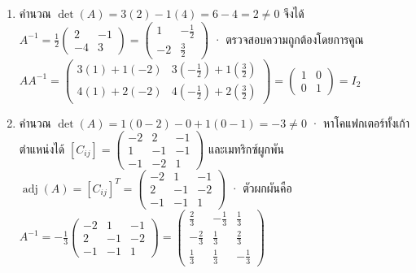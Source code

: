 \begin{enumerate}
    \item คำนวณ $\det(A) = 3(2) - 1(4) = 6 - 4 = 2 \neq 0$ จึงได้ $A^{-1} = \frac{1}{2} \begin{pmatrix} 2 & -1 \\ -4 & 3 \end{pmatrix} = \begin{pmatrix} 1 & -\frac{1}{2} \\ -2 & \frac{3}{2} \end{pmatrix}$ · ตรวจสอบความถูกต้องโดยการคูณ $A A^{-1} = \begin{pmatrix} 3(1)+1(-2) & 3(-\frac{1}{2})+1(\frac{3}{2}) \\ 4(1)+2(-2) & 4(-\frac{1}{2})+2(\frac{3}{2}) \end{pmatrix} = \begin{pmatrix} 1 & 0 \\ 0 & 1 \end{pmatrix} = I_2$

    \item คำนวณ $\det(A) = 1(0-2) - 0 + 1(0-1) = -3 \neq 0$ · หาโคแฟกเตอร์ทั้งเก้าตำแหน่งได้ $[C_{ij}] = \begin{pmatrix} -2 & 2 & -1 \\ 1 & -1 & -1 \\ -1 & -2 & 1 \end{pmatrix}$ และเมทริกซ์ผูกพัน $\operatorname{adj}(A) = [C_{ij}]^T = \begin{pmatrix} -2 & 1 & -1 \\ 2 & -1 & -2 \\ -1 & -1 & 1 \end{pmatrix}$ · ตัวผกผันคือ $A^{-1} = -\frac{1}{3}\begin{pmatrix} -2 & 1 & -1 \\ 2 & -1 & -2 \\ -1 & -1 & 1 \end{pmatrix} = \begin{pmatrix} \frac{2}{3} & -\frac{1}{3} & \frac{1}{3} \\ -\frac{2}{3} & \frac{1}{3} & \frac{2}{3} \\ \frac{1}{3} & \frac{1}{3} & -\frac{1}{3} \end{pmatrix}$


\end{enumerate}
